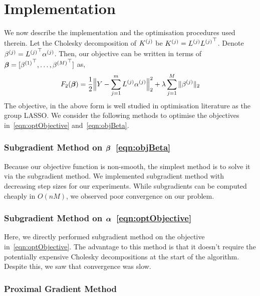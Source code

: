 
\section{Implementation}
\label{sec:implementation}

We now describe the implementation and the optimisation procedures used therein.
Let the Cholesky decomposition of ${K^{(j)}}$ be ${K^{(j)}} = {L^{(j)}} {L^{(j)}}^\top$. 
Denote ${\beta^{(j)}} = {L^{(j)}}^\top {\alpha^{(j)}}$.
Then, our objective can be written in terms of ${\bm{\beta}} = [{\beta^{(1)}}^\top,
\dots, {\beta^{(M)}}^\top]$ as,
\begin{equation}
F_2({\bm{\beta}}) =  \frac{1}{2}\Big\|Y - \sum_{j=1}^m {L^{(j)}} {\alpha^{(j)}}\Big\|_2^2 + 
  \lambda \sum_{j=1}^M \|{\beta^{(j)}}\|_2
\label{eqn:objBeta}
\end{equation}
The objective, in the above form is well studied in optimisation literature as the group
LASSO. 
We consider the following methods to optimise the objectives
in~\eqref{eqn:optObjective} and~\eqref{eqn:objBeta}.

\subsubsection*{Subgradient Method on ${\bm{\beta}}$~\eqref{eqn:objBeta}}
Because our objective function is non-smooth, the simplest method is to solve it via 
the subgradient method. We implemented subgradient method with 
decreasing step sizes for our experiments. 
While subgradients can be computed cheaply in $O(nM)$, we observed poor 
convergence on our problem. %

\subsubsection*{Subgradient Method on ${\bm{\alpha}}$~\eqref{eqn:optObjective}}
Here, we directly performed subgradient method on the objective
in~\eqref{eqn:optObjective}. The advantage to this method is that it doesn't
require the potentially expensive Cholesky decompositions at the start of the
algorithm. Despite this, we saw that convergence was slow.

\subsubsection*{Proximal Gradient Method}

